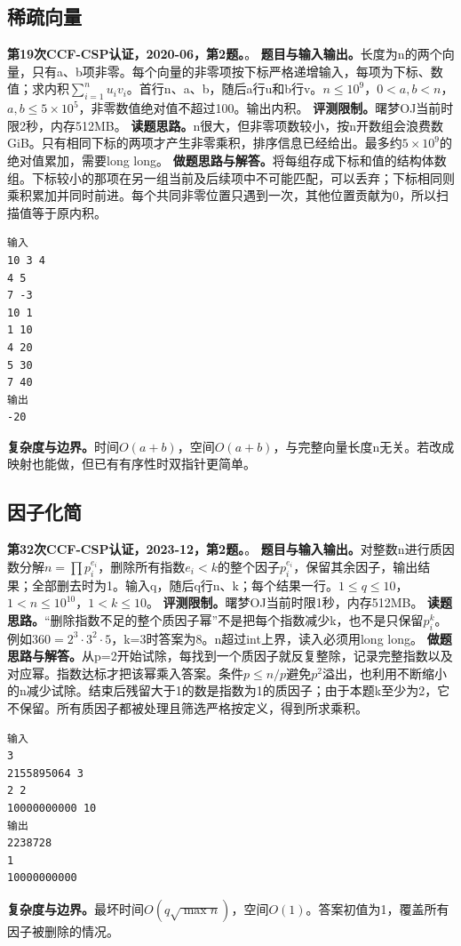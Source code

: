 \subsection{稀疏向量}
\textbf{第19次CCF-CSP认证，2020-06，第2题。}。
\textbf{题目与输入输出。}长度为n的两个向量，只有a、b项非零。每个向量的非零项按下标严格递增输入，每项为下标、数值；求内积$\sum_{i=1}^n u_iv_i$。首行n、a、b，随后a行u和b行v。$n\le10^9$，$0<a,b<n$，$a,b\le5\times10^5$，非零数值绝对值不超过100。输出内积。
\textbf{评测限制。}曙梦OJ当前时限2秒，内存512MB。
\textbf{读题思路。}n很大，但非零项数较小，按n开数组会浪费数GiB。只有相同下标的两项才产生非零乘积，排序信息已经给出。最多约$5\times10^9$的绝对值累加，需要long long。
\textbf{做题思路与解答。}将每组存成下标和值的结构体数组。下标较小的那项在另一组当前及后续项中不可能匹配，可以丢弃；下标相同则乘积累加并同时前进。每个共同非零位置只遇到一次，其他位置贡献为0，所以扫描值等于原内积。
\begin{verbatim}
输入
10 3 4
4 5
7 -3
10 1
1 10
4 20
5 30
7 40
输出
-20
\end{verbatim}
\textbf{复杂度与边界。}时间$O(a+b)$，空间$O(a+b)$，与完整向量长度n无关。若改成映射也能做，但已有有序性时双指针更简单。
\subsection{因子化简}
\textbf{第32次CCF-CSP认证，2023-12，第2题。}。
\textbf{题目与输入输出。}对整数n进行质因数分解$n=\prod p_i^{e_i}$，删除所有指数$e_i<k$的整个因子$p_i^{e_i}$，保留其余因子，输出结果；全部删去时为1。输入q，随后q行n、k；每个结果一行。$1\le q\le10$，$1<n\le10^{10}$，$1<k\le10$。
\textbf{评测限制。}曙梦OJ当前时限1秒，内存512MB。
\textbf{读题思路。}“删除指数不足的整个质因子幂”不是把每个指数减少k，也不是只保留$p_i^k$。例如$360=2^3\cdot3^2\cdot5$，k=3时答案为8。n超过int上界，读入必须用long long。
\textbf{做题思路与解答。}从p=2开始试除，每找到一个质因子就反复整除，记录完整指数以及对应幂。指数达标才把该幂乘入答案。条件$p\le n/p$避免$p^2$溢出，也利用不断缩小的n减少试除。结束后残留大于1的数是指数为1的质因子；由于本题k至少为2，它不保留。所有质因子都被处理且筛选严格按定义，得到所求乘积。
\begin{verbatim}
输入
3
2155895064 3
2 2
10000000000 10
输出
2238728
1
10000000000
\end{verbatim}
\textbf{复杂度与边界。}最坏时间$O(q\sqrt{\max n})$，空间$O(1)$。答案初值为1，覆盖所有因子被删除的情况。
